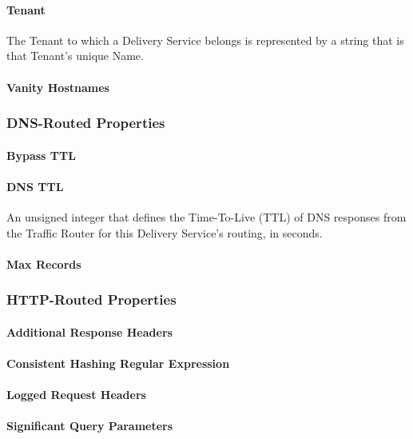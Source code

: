 \paragraph{Tenant}
The Tenant to which a Delivery Service belongs is represented by a string that
is that Tenant's unique Name.

\paragraph{Vanity Hostnames}

\subsubsection{DNS-Routed Properties}

\paragraph{Bypass TTL}

\paragraph{DNS TTL}
An unsigned integer that defines the Time-To-Live (TTL) of DNS responses from
the Traffic Router for this Delivery Service's routing, in seconds.

\paragraph{Max Records}

\subsubsection{HTTP-Routed Properties}

\paragraph{Additional Response Headers}

\paragraph{Consistent Hashing Regular Expression}

\paragraph{Logged Request Headers}

\paragraph{Significant Query Parameters}

